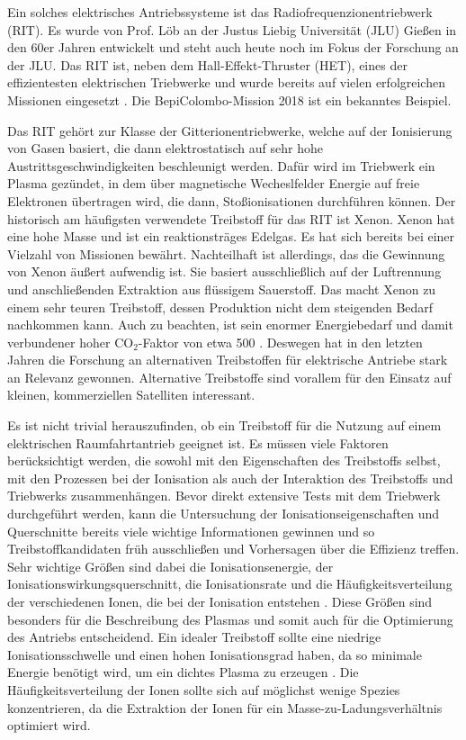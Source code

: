 Ein solches elektrisches Antriebssysteme ist das Radiofrequenzionentriebwerk (RIT). Es wurde von Prof. Löb an der Justus Liebig Universität (JLU) Gießen in den 60er Jahren entwickelt und steht auch heute noch im Fokus der Forschung an der JLU. Das RIT ist, neben dem Hall-Effekt-Thruster (HET), eines der effizientesten elektrischen Triebwerke und wurde bereits auf vielen erfolgreichen Missionen eingesetzt \cite[S. 6]{ion}. Die BepiColombo-Mission 2018 ist ein bekanntes Beispiel.

Das RIT gehört zur Klasse der Gitterionentriebwerke, welche auf der Ionisierung von Gasen basiert, die dann elektrostatisch auf sehr hohe Austrittsgeschwindigkeiten beschleunigt werden. Dafür wird im Triebwerk ein Plasma gezündet, in dem über magnetische Wecheslfelder Energie auf freie Elektronen übertragen wird, die dann, Stoßionisationen durchführen können. Der historisch am häufigsten verwendete Treibstoff für das RIT ist Xenon. Xenon hat eine hohe Masse und ist ein reaktionsträges Edelgas. Es hat sich bereits bei einer Vielzahl von Missionen bewährt. Nachteilhaft ist allerdings, das die Gewinnung von Xenon äußert aufwendig ist. Sie basiert ausschließlich auf der Luftrennung und anschließenden Extraktion aus flüssigem Sauerstoff. Das macht Xenon zu einem sehr teuren Treibstoff, dessen Produktion nicht dem steigenden Bedarf nachkommen kann. Auch zu beachten, ist sein enormer Energiebedarf und damit verbundener hoher CO$_2$-Faktor von etwa 500 \cite{CO2}. Deswegen hat in den letzten Jahren die Forschung an alternativen Treibstoffen für elektrische Antriebe stark an Relevanz gewonnen. Alternative Treibstoffe sind vorallem für den Einsatz auf kleinen, kommerziellen Satelliten interessant. 

Es ist nicht trivial herauszufinden, ob ein Treibstoff für die Nutzung auf einem elektrischen Raumfahrtantrieb geeignet ist. Es müssen viele Faktoren berücksichtigt werden, die sowohl mit den Eigenschaften des Treibstoffs selbst, mit den Prozessen bei der Ionisation als auch der Interaktion des Treibstoffs und Triebwerks zusammenhängen. Bevor direkt extensive Tests mit dem Triebwerk durchgeführt werden, kann die Untersuchung der Ionisationseigenschaften und Querschnitte bereits viele wichtige Informationen gewinnen und so Treibstoffkandidaten früh ausschließen und Vorhersagen über die Effizienz treffen. Sehr wichtige Größen sind dabei die Ionisationsenergie, der Ionisationswirkungsquerschnitt, die Ionisationsrate und die Häufigkeitsverteilung der verschiedenen Ionen, die bei der Ionisation entstehen \cite{ion}. Diese Größen sind besonders für die Beschreibung des Plasmas und somit auch für die Optimierung des Antriebs entscheidend. Ein idealer Treibstoff sollte eine niedrige Ionisationsschwelle und einen hohen Ionisationsgrad haben, da so minimale Energie benötigt wird, um ein dichtes Plasma zu erzeugen \cite{Prop}. Die Häufigkeitsverteilung der Ionen sollte sich auf möglichst wenige Spezies konzentrieren, da die Extraktion der Ionen für ein Masse-zu-Ladungsverhältnis optimiert wird.

